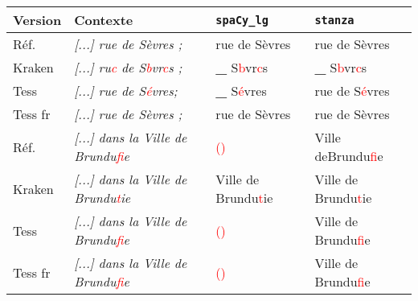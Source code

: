 \begin{tabular}{|l|p{5.5cm}|l|l|}

\hline

\bf{Version} & \bf {Contexte} & \bf{\texttt{spaCy\_lg}}&\bf{\texttt{stanza}}\\
\hline

Réf.\ & \textit{[...] rue de Sèvres ;}&rue de Sèvres
 & rue de Sèvres \\

Kraken & \textit{[...] ru\textcolor{red}{c} de S\textcolor{red}{b}vr\textcolor{red}{c}s ;} & \textbf{\_} S\textcolor{red}{b}vr\textcolor{red}{c}s &  \textbf{\_} S\textcolor{red}{b}vr\textcolor{red}{c}s \\ 

Tess & \textit{[...] rue de S\textcolor{red}{é}vres;}& \textbf{\_} S\textcolor{red}{é}vres &  rue de S\textcolor{red}{é}vres\\
Tess fr &  \textit{[...]  rue de Sèvres ;} & rue de Sèvres & rue de Sèvres\\
\hline %

Réf.\ & \textit{[...] dans la Ville de Brundu\textcolor{red}{f}ie} & \textcolor{red}{()}& Ville deBrundu\textcolor{red}{f}ie\\
 Kraken &\textit{[...] dans la Ville de Brundu\textcolor{red}{t}ie} &Ville de Brundu\textcolor{red}{t}ie & Ville de  Brundu\textcolor{red}{t}ie \\ 
 Tess & \textit{[...] dans la Ville de Brundu\textcolor{red}{f}ie} & \textcolor{red}{()} &Ville de Brundu\textcolor{red}{f}ie  \\
Tess fr & \textit{[...] dans la Ville de Brundu\textcolor{red}{f}ie} & \textcolor{red}{()} & Ville de Brundu\textcolor{red}{f}ie \\
\hline
\end{tabular}


